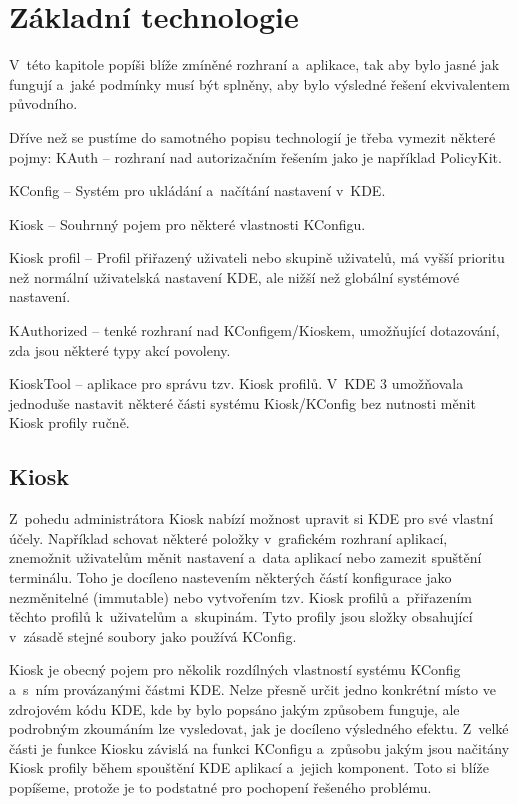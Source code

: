 \chapter{Základní technologie}
V~této kapitole popíši blíže zmíněné rozhraní a~aplikace, tak aby bylo jasné jak fungují
a~jaké podmínky musí být splněny, aby bylo výsledné řešení ekvivalentem původního.

Dříve než se pustíme do samotného popisu technologií je třeba vymezit některé pojmy:
KAuth -- rozhraní nad autorizačním řešením jako je například PolicyKit.

KConfig -- Systém pro ukládání a~načítání nastavení v~KDE.

Kiosk -- Souhrnný pojem pro některé vlastnosti KConfigu.

Kiosk profil -- Profil přiřazený uživateli nebo skupině uživatelů, má vyšší prioritu
než normální uživatelská nastavení KDE, ale nižší než globální systémové nastavení.

KAuthorized -- tenké rozhraní nad KConfigem/Kioskem, umožňující dotazování, zda
jsou některé typy akcí povoleny.

KioskTool -- aplikace pro správu tzv. Kiosk profilů. V~KDE 3 umožňovala jednoduše
nastavit některé části systému Kiosk/KConfig bez nutnosti měnit Kiosk profily ručně.

\section{Kiosk}
Z~pohedu administrátora Kiosk nabízí možnost upravit si KDE pro své vlastní
účely. Například schovat některé položky v~grafickém rozhraní aplikací,
znemožnit uživatelům měnit nastavení a~data aplikací nebo zamezit spuštění
terminálu. Toho je docíleno nastevením některých částí konfigurace jako
nezměnitelné (immutable) nebo vytvořením tzv. Kiosk profilů a~přiřazením těchto
profilů k~uživatelům a~skupinám. Tyto profily jsou složky obsahující v~zásadě
stejné soubory jako používá KConfig.

Kiosk je obecný pojem pro několik rozdílných vlastností systému KConfig a~s~ním
provázanými částmi KDE. Nelze přesně určit jedno konkrétní místo ve zdrojovém kódu
KDE, kde by bylo popsáno jakým způsobem funguje, ale podrobným zkoumáním lze vysledovat,
jak je docíleno výsledného efektu. Z~velké části je funkce Kiosku závislá na funkci
KConfigu a~způsobu jakým jsou načitány Kiosk profily během spouštění KDE aplikací
a~jejich komponent. Toto si blíže popíšeme, protože je to podstatné pro pochopení
řešeného problému.

